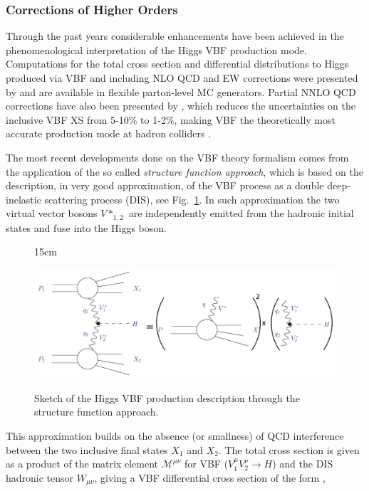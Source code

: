 \subsubsection{Corrections of Higher Orders}
Through the past years considerable enhancements have been achieved in the phenomenological interpretation of the Higgs VBF production mode. Computations for the total cross section and differential distributions to Higgs produced via VBF and including NLO QCD and EW corrections were presented by \cite{bib:Phys46-203-1998,bib:PhysRevLett69-3274-1992} and are available in flexible parton-level MC generators. Partial NNLO QCD corrections have also been presented by \cite{bib:PhysRevD77-053010-2008,bib:PhysRevLett105-011801-2010}, which reduces the uncertainties on the inclusive VBF XS from 5-10$\%$ to 1-2$\%$, making VBF the theoretically most accurate production mode at hadron colliders \cite{bib:ChinPhysC-38-9-2014}. 

The most recent developments done on the VBF theory formalism comes from the application of the so called \textit{structure function approach}, which is based on the description, in very good approximation, of the VBF process as a double deep-inelastic scattering process (DIS), see Fig.~\ref{fig:vbf_DIS_approx}. In such approximation the two virtual vector bosons $V*_{1,2}$ are independently emitted from the hadronic initial states and fuse into the Higgs boson. 

\begin{figure}[htbp]{15cm}
	\caption{Sketch of the Higgs VBF production description through the structure function approach.}
	\includegraphics[scale=0.4]{ChapterTheory/figs/vbf_DIS_approximation}
	\label{fig:vbf_DIS_approx}
\end{figure}

This approximation builds on the absence (or smallness) of QCD interference between the two inclusive final states $X_{1}$ and $X_{2}$. The total cross section is given as a product of the matrix element $\mathcal{M}^{\mu\nu}$ for VBF ($V_{1}^{\mu}V_{2}^{\nu} \rightarrow H$) and the DIS hadronic tensor $W_{\mu\nu}$, giving a VBF differential cross section of the form \cite{bib:PhysRevLett105-011801-2010,bib:PhysRevLett69-3274-1992},

